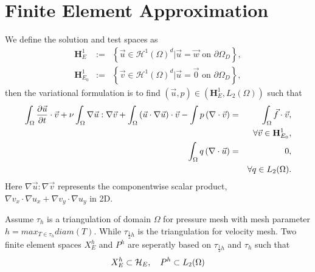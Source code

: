 \documentclass[a4paper, 11pt]{article}
\begin{document}
\section{Finite Element Approximation}
    We define the solution and test spaces as
    \begin{eqnarray}
      \mathbf{H}_E^1 & := & \left\{ \vec{u} \in \mathcal{H}^1(\Omega)^d \big|
        \vec{u} = \vec{w} \mbox{ on } \partial \Omega_D \right\},\\
      \mathbf{H}_{E_0}^1 & := & \left\{ \vec{v} \in \mathcal{H}^1(\Omega)^d \big|
        \vec{u} = \vec{0} \mbox{ on } \partial \Omega_D \right\},
    \end{eqnarray}
    then the variational formulation is to find  $(\vec{u}, p) \in
   (\mathbf{H}_E^1, L_2(\Omega))$ such that
   \begin{eqnarray}
     \int_{\Omega}\frac{\partial \vec{u}}{\partial t} \cdot \vec{v} + 
     \nu \int_\Omega \nabla \vec{u} : \nabla \vec{v} + \int_\Omega \left(
       \vec{u} \cdot \nabla \vec{u} \right) \cdot \vec{v} - \int p
     \left( \nabla \cdot \vec{v} \right) & = & \int_\Omega \vec{f} \cdot
     \vec{v}, \label{eq::generalweak_momentum}\\
     & & \forall \vec{v} \in \mathbf{H}_{E_0}^1,\notag \\
     \int_\Omega q \left( \nabla \cdot \vec{u} \right) & = & 0,
     \label{eq::generalweak_mass} \\
     & & \forall q \in L_2(\Omega). \notag
   \end{eqnarray}
   Here $\nabla \vec{u} : \nabla \vec{v}$ represents the componentwise
   scalar product, $\nabla v_x \cdot \nabla u_x + \nabla
   v_y \cdot \nabla u_y$ in 2D.

   Assume $\tau_h$ is a triangulation of domain $\Omega$ for
   pressure mesh with mesh parameter $h = max_{T \in \tau_h} diam(T)$.
   While $\tau_{\frac{1}{2}h}$ is the triangulation for velocity mesh.
   Two finite element spaces $X_E^h$ and $P^h$ are seperatly based on
   $\tau_{\frac{1}{2}h}$ and $\tau_h$ such that
   \begin{equation}
     X_E^h \subset \mathcal{H}_E, \quad P^h \subset L_2(\Omega) 
     \notag 
   \end{equation}
   
\end{document}
